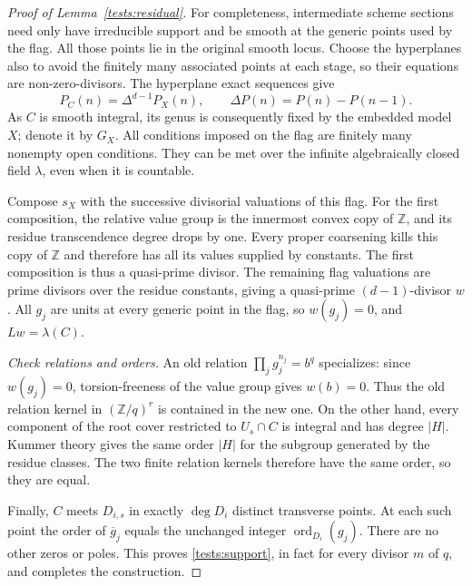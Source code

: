 \begin{proof}[Proof of Lemma~\ref{tests:residual}]
For completeness, intermediate scheme sections need only have
irreducible support and be smooth at the generic points used by the
flag.  All those points lie in the original smooth locus.
Choose the hyperplanes also to avoid the finitely many associated
points at each stage, so their equations are non-zero-divisors.
The hyperplane exact sequences give
\[
 P_C(n)=\Delta^{d-1}P_X(n),\qquad
 \Delta P(n)=P(n)-P(n-1).
\]
As $C$ is smooth integral, its genus is consequently fixed by the
embedded model $X$; denote it by $G_X$.
All conditions imposed on the flag are finitely many nonempty open
conditions.  They can be met over the infinite algebraically closed
field $\lambda$, even when it is countable.

Compose $s_X$ with the successive divisorial valuations of this flag.
For the first composition, the relative value group is the innermost
convex copy of $\mathbb Z$, and its residue transcendence degree drops
by one.  Every proper coarsening kills this copy of $\mathbb Z$ and
therefore has all its values supplied by constants.
The first composition is thus a quasi-prime divisor.  The remaining
flag valuations are prime divisors over the residue constants, giving
a quasi-prime $(d-1)$-divisor $w$.
All $g_j$ are units at every generic point in the flag, so $w(g_j)=0$,
and $Lw=\lambda(C)$.

\emph{Check relations and orders.}
An old relation $\prod_jg_j^{n_j}=b^q$ specializes: since $w(g_j)=0$,
torsion-freeness of the value group gives $w(b)=0$.
Thus the old relation kernel in $(\mathbb Z/q)^r$ is contained in the
new one.
On the other hand, every component of the root cover restricted to
$U_s\cap C$ is integral and has degree $|H|$.
Kummer theory gives the same order $|H|$ for the subgroup generated by
the residue classes.  The two finite relation kernels therefore have
the same order, so they are equal.

Finally, $C$ meets $D_{i,s}$ in exactly $\deg D_i$ distinct transverse
points.  At each such point the order of $\overline g_j$ equals the
unchanged integer $\operatorname{ord}_{D_i}(g_j)$.
There are no other zeros or poles.  This proves
\eqref{tests:support}, in fact for every divisor $m$ of $q$, and
completes the construction.
\end{proof}
